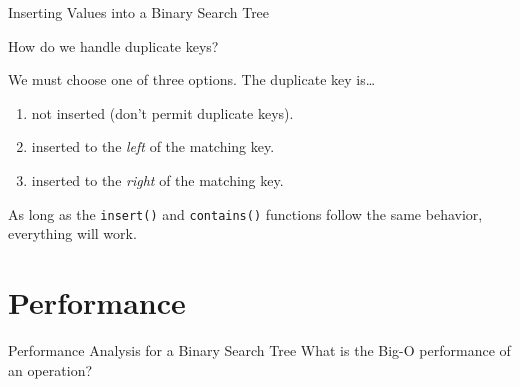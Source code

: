 \documentclass[14pt,aspectratio=1610]{beamer}
\begin{document}
\begin{frame}{Inserting Values into a Binary Search Tree}
\begin{center}
  \Large
  How do we handle duplicate keys?
\end{center}
\pause%
We must choose one of three options. The duplicate key is\ldots

\begin{enumerate}
  \item not inserted (don't permit duplicate keys).
  \item inserted to the \emph{left} of the matching key.
  \item inserted to the \emph{right} of the matching key.
\end{enumerate}

As long as the \lstinline{insert()} and \lstinline{contains()} functions follow the same behavior, everything will work.
\end{frame}

\section{Performance}

\begin{frame}{Performance Analysis for a Binary Search Tree}
  \centering\large
  What is the Big-O performance of an operation?
\end{frame}
\end{document}
